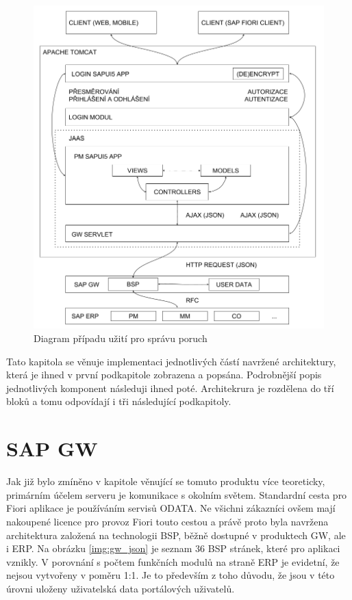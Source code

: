\documentclass[thesis=M,czech]{FITthesis}[2012/06/26]
\begin{document}
\begin{figure}[H]
	\centering
	\includegraphics[width=1\textwidth]{images/architektura}
	\caption{Diagram případu užití pro správu poruch}
	\label{img:architektura}
\end{figure}

Tato kapitola se věnuje implementaci jednotlivých částí navržené architektury, která je ihned v první podkapitole zobrazena a popsána. Podrobnější popis jednotlivých komponent následuji ihned poté. Architekrura je rozdělena do tří bloků a tomu odpovídají i tři následující podkapitoly. 



\section{SAP GW}
Jak již bylo zmíněno v kapitole věnující se tomuto produktu více teoreticky, primárním účelem serveru je komunikace s okolním světem. Standardní cesta pro Fiori aplikace je používáním servisů ODATA. Ne všichni zákazníci ovšem mají nakoupené licence pro provoz Fiori touto cestou a právě proto byla navržena architektura založená na technologii BSP, běžně dostupné v produktech GW, ale i ERP. Na obrázku \ref{img:gw_json} je seznam 36 BSP stránek, které pro aplikaci vznikly. V porovnání s počtem funkčních modulů na straně ERP je evidetní, že nejsou vytvořeny v poměru 1:1. Je to především z toho důvodu, že jsou v této úrovni uloženy uživatelská data portálových uživatelů. 
\end{document}
